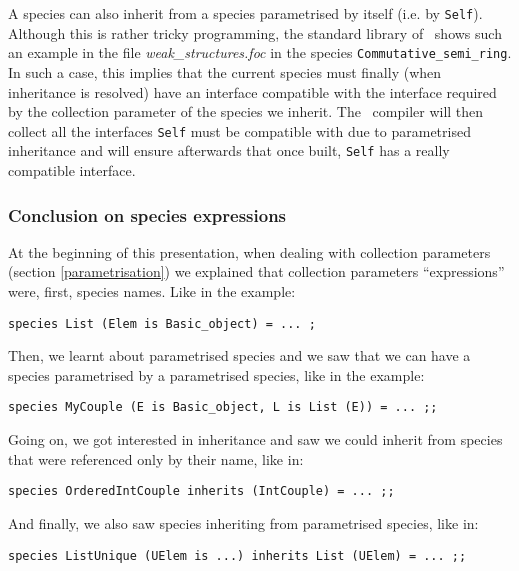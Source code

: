 A species can also inherit from a species parametrised by itself
(i.e. by {\tt Self}). Although this is rather tricky programming, the
standard library of \focal\ shows such an example in the file
{\em weak\_structures.foc} in the species
{\tt Commutative\_semi\_ring}. In such a case, this implies that the
current species must finally (when inheritance is resolved) have an
interface compatible with the interface required by the collection
parameter of the species we inherit. The \focal\ compiler will then
collect all the interfaces {\tt Self} must be compatible with due to
parametrised inheritance and will ensure afterwards that once built,
{\tt Self} has a really compatible interface.



\subsubsection{Conclusion on species expressions}
At the beginning of this presentation, when dealing with collection
parameters (section \ref{parametrisation}) we explained that
collection parameters ``expressions'' were, first, species names. Like
in the example:
{\scriptsize
\begin{lstlisting}
species List (Elem is Basic_object) = ... ;
\end{lstlisting}
}

Then, we learnt about parametrised species and we saw that we can have
a species parametrised by a parametrised species, like in the example:
{\scriptsize
\begin{lstlisting}
species MyCouple (E is Basic_object, L is List (E)) = ... ;;
\end{lstlisting}
}

Going on, we got interested in inheritance and saw we could inherit
from species that were referenced only by their name, like in:
{\scriptsize
\begin{lstlisting}
species OrderedIntCouple inherits (IntCouple) = ... ;;
\end{lstlisting}
}

And finally, we also saw species inheriting from parametrised
species, like in:
{\scriptsize
\begin{lstlisting}
species ListUnique (UElem is ...) inherits List (UElem) = ... ;;
\end{lstlisting}
}

